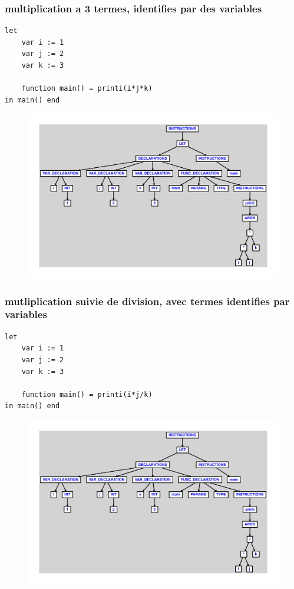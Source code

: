 \documentclass{article}
\begin{document}
\subsubsection{multiplication a 3 termes, identifies par des variables}
\begin{lstlisting}
let
	var i := 1
	var j := 2
	var k := 3

	function main() = printi(i*j*k)
in main() end
\end{lstlisting}
\newpage
\begin{figure}[H]
\centering
\includegraphics[max width=\textwidth]{ast/ast_61.pdf}
\end{figure}
\newpage
\subsubsection{mutliplication suivie de division, avec termes identifies par variables}
\begin{lstlisting}
let
	var i := 1
	var j := 2
	var k := 3

	function main() = printi(i*j/k)
in main() end
\end{lstlisting}
\newpage
\begin{figure}[H]
\centering
\includegraphics[max width=\textwidth]{ast/ast_62.pdf}
\end{figure}
\newpage
\end{document}

